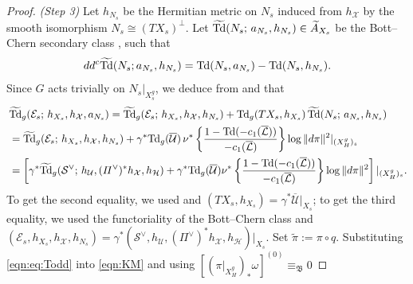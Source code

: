 \documentclass[amscd, leqno]{amsart}
\theoremstyle{plain}
\theoremstyle{definition}
\theoremstyle{remark}
\newenvironment{pf}{\begin{proof}}{\end{proof}}
\begin{document}
\begin{pf}
\par{\em (Step 3) }
Let $h_{N_{s}}$ be the Hermitian metric on $N_{s}$ induced from $h_{\mathcal X}$ by the smooth isomorphism $N_{s}\cong(TX_{s})^{\perp}$. 
Let $\widetilde{\rm Td}(N_{s};\,a_{N_{s}},h_{N_{s}})\in\widetilde{A}_{X_{s}}$ be the Bott--Chern secondary class 
\cite[I e)]{BGS88}, \cite[Sect.\,1.2.4]{GilletSoule90} such that
$$
dd^{c} \widetilde{\rm Td}( N_{s}; a_{N_{s}}, h_{N_{s}} ) = {\rm Td}( N_{s}, a_{N_{s}} ) - {\rm Td}( N_{s}, h_{N_{s}} ).
$$
Since $G$ acts trivially on $N_{s}|_{X_{s}^{g}}$, we deduce from \cite[I, Props.\,1.3.2 and 1.3.4]{GilletSoule90} and 
\cite[Th.\,3.4, especially the formula for $\widetilde{\phi_{\zeta}\phi_{\eta}}$]{KohlerRoessler01} that
\begin{equation}
\label{eqn:eq:Todd}
\begin{aligned}
\,&
\widetilde{\rm Td}_{g}({\mathcal E}_{s};\,h_{X_{s}},h_{\mathcal X},a_{N_{s}})
=
\widetilde{\rm Td}_{g}({\mathcal E}_{s};\,h_{X_{s}},h_{\mathcal X},h_{N_{s}}) 
+ {\rm Td}_{g}(TX_{s},h_{X_{s}})\,\widetilde{\rm Td}(N_{s};\,a_{N_{s}},h_{N_{s}})
\\
&=
\widetilde{\rm Td}_{g}({\mathcal E}_{s};\,h_{X_{s}},h_{\mathcal X},h_{N_{s}})
+
\gamma^{*}{\rm Td}_{g}(\overline{\mathcal U})\, 
\nu^{*} \left\{ \frac{1-{\rm Td}(-c_{1}(\overline{\mathcal L}))}{-c_{1}(\overline{\mathcal L})} \right\} \log\|d\pi\|^{2}
|_{(X^{g}_{H})_{s}}
\\
&=
\left[
\gamma^{*}\widetilde{\rm Td}_{g} ( {\mathcal S}^{\lor};\, h_{\mathcal U},(\varPi^{\lor})^{*}h_{\mathcal X},h_{\mathcal H} )
+
\gamma^{*}{\rm Td}_{g}( \overline{\mathcal U} ) 
\nu^{*} \left\{ \frac{1-{\rm Td}(-c_{1}(\overline{\mathcal L}))}{-c_{1}(\overline{\mathcal L})} \right\} \log\|d\pi\|^{2}
\right]
|_{(X^{g}_{H})_{s}}.
\end{aligned}
\end{equation}
To get the second equality, we used \cite[Eq.\,(13)]{Yoshikawa07} and $(TX_{s},h_{X_{s}})=\gamma^{*}\overline{\mathcal U}|_{X_{s}}$; 
to get the third equality, we used the functoriality of the Bott--Chern class \cite[Th.\,3.4]{KohlerRoessler01} and 
$({\mathcal E}_{s},h_{X_{s}},h_{\mathcal X},h_{N_{s}}) = 
\gamma^{*}({\mathcal S}^{\lor},h_{\mathcal U},(\varPi^{\lor})^{*}h_{\mathcal X},h_{\mathcal H})|_{X_{s}}$.
Set $\widetilde{\pi}:=\pi\circ q$.
Substituting \eqref{eqn:eq:Todd} into \eqref{eqn:KM} and using $[(\pi|_{X^{g}_{H}})_{*}\omega]^{(0)}\equiv_{\mathfrak B} 0$ 

\end{pf}
\end{document}
